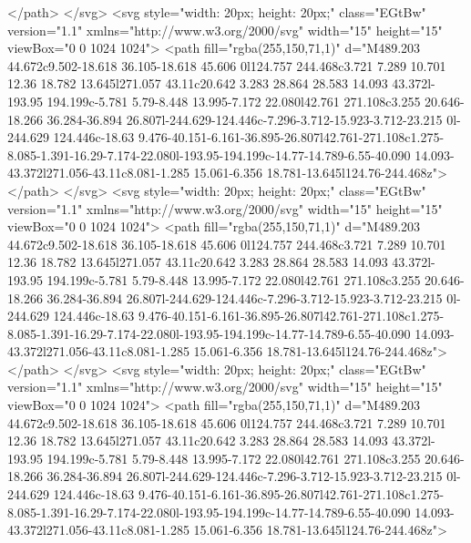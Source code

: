                     </path>
                  </svg>
                  <svg style="width: 20px; height: 20px;" class="EGtBw" version="1.1"
                    xmlns="http://www.w3.org/2000/svg" width="15" height="15" viewBox="0 0 1024 1024">
                    <path fill="rgba(255,150,71,1)"
                      d="M489.203 44.672c9.502-18.618 36.105-18.618 45.606 0l124.757 244.468c3.721 7.289 10.701 12.36 18.782 13.645l271.057 43.11c20.642 3.283 28.864 28.583 14.093 43.372l-193.95 194.199c-5.781 5.79-8.448 13.995-7.172 22.080l42.761 271.108c3.255 20.646-18.266 36.284-36.894 26.807l-244.629-124.446c-7.296-3.712-15.923-3.712-23.215 0l-244.629 124.446c-18.63 9.476-40.151-6.161-36.895-26.807l42.761-271.108c1.275-8.085-1.391-16.29-7.174-22.080l-193.95-194.199c-14.77-14.789-6.55-40.090 14.093-43.372l271.056-43.11c8.081-1.285 15.061-6.356 18.781-13.645l124.76-244.468z">
                    </path>
                  </svg>
                  <svg style="width: 20px; height: 20px;" class="EGtBw" version="1.1"
                    xmlns="http://www.w3.org/2000/svg" width="15" height="15" viewBox="0 0 1024 1024">
                    <path fill="rgba(255,150,71,1)"
                      d="M489.203 44.672c9.502-18.618 36.105-18.618 45.606 0l124.757 244.468c3.721 7.289 10.701 12.36 18.782 13.645l271.057 43.11c20.642 3.283 28.864 28.583 14.093 43.372l-193.95 194.199c-5.781 5.79-8.448 13.995-7.172 22.080l42.761 271.108c3.255 20.646-18.266 36.284-36.894 26.807l-244.629-124.446c-7.296-3.712-15.923-3.712-23.215 0l-244.629 124.446c-18.63 9.476-40.151-6.161-36.895-26.807l42.761-271.108c1.275-8.085-1.391-16.29-7.174-22.080l-193.95-194.199c-14.77-14.789-6.55-40.090 14.093-43.372l271.056-43.11c8.081-1.285 15.061-6.356 18.781-13.645l124.76-244.468z">
                    </path>
                  </svg>
                  <svg style="width: 20px; height: 20px;" class="EGtBw" version="1.1"
                    xmlns="http://www.w3.org/2000/svg" width="15" height="15" viewBox="0 0 1024 1024">
                    <path fill="rgba(255,150,71,1)"
                      d="M489.203 44.672c9.502-18.618 36.105-18.618 45.606 0l124.757 244.468c3.721 7.289 10.701 12.36 18.782 13.645l271.057 43.11c20.642 3.283 28.864 28.583 14.093 43.372l-193.95 194.199c-5.781 5.79-8.448 13.995-7.172 22.080l42.761 271.108c3.255 20.646-18.266 36.284-36.894 26.807l-244.629-124.446c-7.296-3.712-15.923-3.712-23.215 0l-244.629 124.446c-18.63 9.476-40.151-6.161-36.895-26.807l42.761-271.108c1.275-8.085-1.391-16.29-7.174-22.080l-193.95-194.199c-14.77-14.789-6.55-40.090 14.093-43.372l271.056-43.11c8.081-1.285 15.061-6.356 18.781-13.645l124.76-244.468z">
